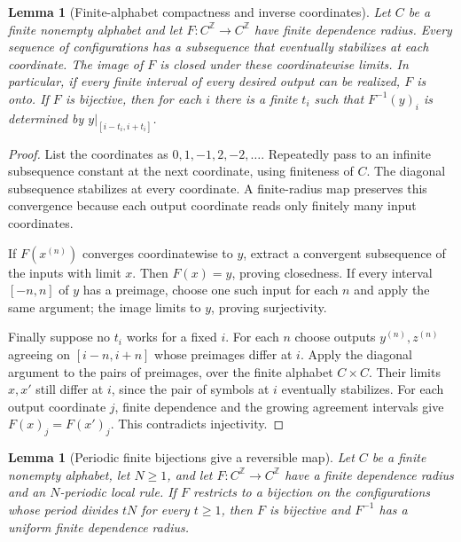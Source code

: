 \documentclass[11pt]{article}
\newtheorem{lemma}[theorem]{Lemma}
\theoremstyle{definition}
\theoremstyle{remark}
\begin{document}
\begin{lemma}[Finite-alphabet compactness and inverse coordinates]
\label{lem:configuration-compactness}
Let $C$ be a finite nonempty alphabet and let
$F:C^{\mathbb Z}\to C^{\mathbb Z}$ have finite dependence radius.
Every sequence of configurations has a subsequence that eventually
stabilizes at each coordinate.  The image of $F$ is closed under these
coordinatewise limits.  In particular, if every finite interval of every
desired output can be realized, $F$ is onto.
If $F$ is bijective, then for each $i$ there is a finite $t_i$ such that
$F^{-1}(y)_i$ is determined by $y|_{[i-t_i,i+t_i]}$.
\end{lemma}

\begin{proof}
List the coordinates as $0,1,-1,2,-2,\ldots$.  Repeatedly pass to an
infinite subsequence constant at the next coordinate, using finiteness of
$C$.  The diagonal subsequence stabilizes at every coordinate.
A finite-radius map preserves this convergence because each output
coordinate reads only finitely many input coordinates.

If $F(x^{(n)})$ converges coordinatewise to $y$, extract a convergent
subsequence of the inputs with limit $x$.  Then $F(x)=y$, proving
closedness.  If every interval $[-n,n]$ of $y$ has a preimage, choose
one such input for each $n$ and apply the same argument; the image limits
to $y$, proving surjectivity.

Finally suppose no $t_i$ works for a fixed $i$.  For each $n$ choose
outputs $y^{(n)},z^{(n)}$ agreeing on $[i-n,i+n]$ whose preimages differ
at $i$.  Apply the diagonal argument to the pairs of preimages, over
the finite alphabet $C\times C$.  Their limits $x,x'$ still differ
at $i$, since the pair of symbols at $i$ eventually stabilizes.
For each output coordinate $j$, finite dependence and the growing
agreement intervals give $F(x)_j=F(x')_j$.  This contradicts injectivity.
\end{proof}

\begin{lemma}[Periodic finite bijections give a reversible map]
\label{lem:periodic-reversible}
Let $C$ be a finite nonempty alphabet, let $N\ge1$, and let
$F:C^{\mathbb Z}\to C^{\mathbb Z}$ have a finite dependence radius and an
$N$-periodic local rule.  If $F$ restricts to a bijection on the
configurations whose period divides $tN$ for every $t\ge1$, then $F$
is bijective and $F^{-1}$ has a uniform finite dependence radius.
\end{lemma}
\end{document}
